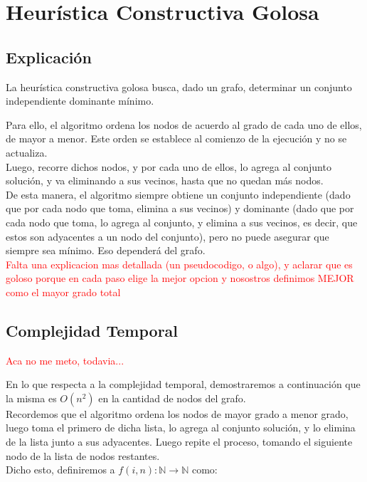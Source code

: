 \section{Heur\'istica Constructiva Golosa} \label{ej3}
\subsection{Explicaci\'on}
La heurística constructiva golosa busca, dado un grafo, determinar un conjunto independiente dominante mínimo. 

Para ello, el algoritmo ordena los nodos de acuerdo al grado de cada uno de ellos, de mayor a menor. Este orden se establece al comienzo de la ejecución y no se actualiza.\\

Luego, recorre dichos nodos, y por cada uno de ellos, lo agrega al conjunto solución, y va eliminando a sus vecinos, hasta que no quedan más nodos.\\

De esta manera, el algoritmo siempre obtiene un conjunto independiente (dado que por cada nodo que toma, elimina a sus vecinos) y dominante (dado que por cada nodo que toma, lo agrega al conjunto, y elimina a sus vecinos, es decir, que estos son adyacentes a un nodo del conjunto), pero no puede asegurar que siempre sea mínimo. Eso dependerá del grafo.\\

\textcolor{red}{Falta una explicacion mas detallada (un pseudocodigo, o algo), y aclarar que es goloso porque en cada paso elige la mejor opcion y nosostros definimos MEJOR como el mayor grado total}

\newpage
\subsection{Complejidad Temporal}\label{compej3}
\textcolor{red}{Aca no me meto, todavia...}

En lo que respecta a la complejidad temporal, demostraremos a continuación que la misma es $O(n^{2})$ en la cantidad de nodos del grafo.\\

Recordemos que el algoritmo ordena los nodos de mayor grado a menor grado, luego toma el primero de dicha lista, lo agrega al conjunto solución, y lo elimina de la lista junto a sus adyacentes. Luego repite el proceso, tomando el siguiente nodo de la lista de nodos restantes.\\
Dicho esto, definiremos a $f(i,n): \mathbb{N} \rightarrow \mathbb{N}$ como:

